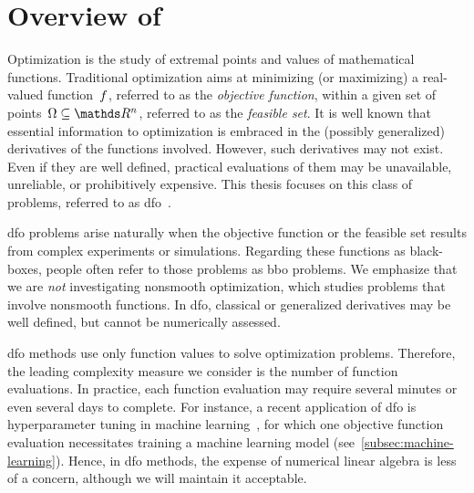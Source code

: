 \section{Overview of }

Optimization is the study of extremal points and values of mathematical functions.
Traditional optimization aims at minimizing (or maximizing) a real-valued function~$f$, referred to as the \emph{objective function}, within a given set of points~$\Omega \subseteq \R^n$, referred to as the \emph{feasible set}.
It is well known that essential information to optimization is embraced in the (possibly generalized) derivatives of the functions involved.
However, such derivatives may not exist.
Even if they are well defined, practical evaluations of them may be unavailable, unreliable, or prohibitively expensive.
This thesis focuses on this class of problems, referred to as \gls{dfo}~\cite{Conn_Scheinberg_Vicente_2009b,Audet_Hare_2017,Custodio_Scheinberg_Vicente_2017,Larson_Menickelly_Wild_2019}.

\Gls{dfo} problems arise naturally when the objective function or the feasible set results from complex experiments or simulations.
Regarding these functions as black-boxes, people often refer to those problems as \gls{bbo} problems.
We emphasize that we are \emph{not} investigating nonsmooth optimization, which studies problems that involve nonsmooth functions.
In \gls{dfo}, classical or generalized derivatives may be well defined, but cannot be numerically assessed.

\Gls{dfo} methods use only function values to solve optimization problems.
Therefore, the leading complexity measure we consider is the number of function evaluations.
In practice, each function evaluation may require several minutes or even several days to complete.
For instance, a recent application of \gls{dfo} is hyperparameter tuning in machine learning~\cite{Ghanbari_Scheinberg_2017}, for which one objective function evaluation necessitates training a machine learning model (see~\cref{subsec:machine-learning}).
Hence, in \gls{dfo} methods, the expense of numerical linear algebra is less of a concern, although we will maintain it acceptable.

